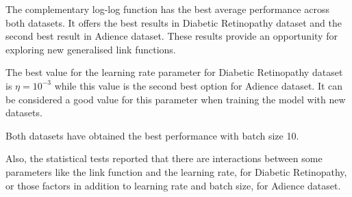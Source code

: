 \documentclass[10pt, a4paper, titlepage, twocolumn]{article}
\begin{document}
	The complementary log-log function has the best average performance across both datasets. It offers the best results in Diabetic Retinopathy dataset and the second best result in Adience dataset. These results provide an opportunity for exploring new generalised link functions.
	
	The best value for the learning rate parameter for  Diabetic Retinopathy dataset is $\eta = 10^{-3}$ while this value is the second best option for Adience dataset. It can be considered a good value for this parameter when training the model with new datasets.
	
	Both datasets have obtained the best performance with batch size 10.
	
	Also, the statistical tests reported that there are interactions between some parameters like the link function and the learning rate, for Diabetic Retinopathy, or those factors in addition to learning rate and batch size, for Adience dataset.
	
	
	\printbibliography
	
\end{document}
